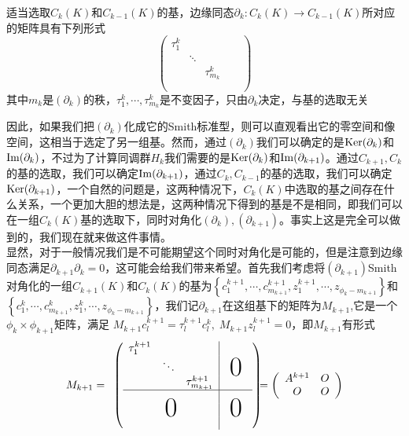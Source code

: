 \begin{proposition}
适当选取$C_{k}(K)$和$C_{k-1}(K)$的基，边缘同态$\partial_{k}:C_{k}(K)\rightarrow C_{k-1}(K)$所对应的矩阵具有下列形式
\begin{equation*}
   \left(\begin{array}{ccccc}
     \tau^{k}_{1}& & & & \\
     & \ddots& & &  \\
      & &\tau^{k}_{m_{k}} & &  \\
       & & & &  \\
     \end{array} \right) 
\end{equation*}
其中$m_{k}$是$(\partial_{k})$的秩，$\tau^{k}_{1},\cdots,\tau^{k}_{m_{k}}$是不变因子，只由$\partial_{k}$决定，与基的选取无关
\end{proposition}
因此，如果我们把$(\partial_{k})$化成它的Smith标准型，则可以直观看出它的零空间和像空间，这相当于选定了另一组基。然而，通过$(\partial_{k})$我们可以确定的是${\rm Ker}(\partial_{k})$和${\rm Im}(\partial_{k})$，不过为了计算同调群$H_{k}$我们需要的是${\rm Ker}(\partial_{k})$和${\rm Im}(\partial_{k+1})$。通过$C_{k+1},C_{k}$的基的选取，我们可以确定${\rm Im}(\partial_{k+1})$，通过$C_{k},C_{k-1}$的基的选取，我们可以确定${\rm Ker}(\partial_{k+1})$，一个自然的问题是，这两种情况下，$C_{k}(K)$中选取的基之间存在什么关系，一个更加大胆的想法是，这两种情况下得到的基是不是相同，即我们可以在一组$C_{k}(K)$基的选取下，同时对角化$(\partial_{k}),(\partial_{k+1})$。事实上这是完全可以做到的，我们现在就来做这件事情。\\
显然，对于一般情况我们是不可能期望这个同时对角化是可能的，但是注意到边缘同态满足$\partial_{k+1}\partial_{k}=0$，这可能会给我们带来希望。首先我们考虑将$(\partial_{k+1})$Smith对角化的一组$C_{k+1}(K)$和$C_{k}(K)$的基为$\left\{{c_{1}^{k+1},\cdots,c_{m_{k+1}}^{k+1},z_{1}^{k+1},\cdots,z_{\phi_{k}-m_{k+1}}}\right\}$和$\left\{{c_{1}^{k},\cdots,c_{m_{k+1}}^{k},z_{1}^{k},\cdots,z_{\phi_{k}-m_{k+1}}}\right\}$，我们记$\partial_{k+1}$在这组基下的矩阵为$M_{k+1}$,它是一个$\phi_{k}\times \phi_{k+1}$矩阵，满足
$M_{k+1}c_{l}^{k+1}=\tau^{k+1}_{l}c_{l}^{k},\;M_{k+1}z_{l}^{k+1}=0$，即$M_{k+1}$有形式
\begin{equation*}
	M_{k+1}=\begin{array}{c@{\hspace{-5pt}}l}	
	\left(\begin{array}{ccc|ccc}	
	\tau^{k+1}_{1}& & & & &\\	
	&\ddots & & & \\	
	& &\tau^{k+1}_{m_{k+1}}& \multicolumn{3}{c}{\raisebox{2ex}[0pt]{\Huge0}}\\\hline	
	& & & & & \\	
	& & & & & \\	
	\multicolumn{3}{c|}{\raisebox{2ex}[0pt]{\Huge0}}
	& 	\multicolumn{3}{c}{\raisebox{2ex}[0pt]{\Huge0}}	
	\end{array}\right)
	\end{array}=\left(\begin{array}{cc}
	    A^{k+1} & O \\
	    O & O 
	\end{array}\right)
	\end{equation*}
